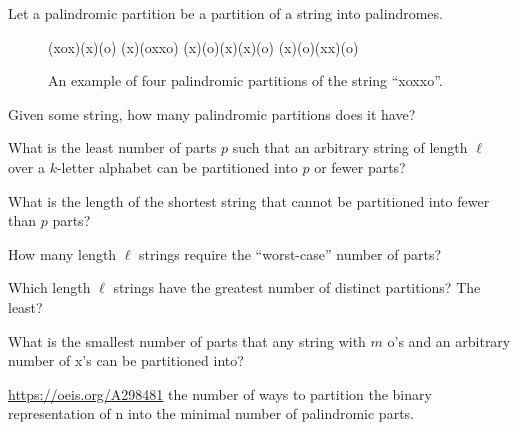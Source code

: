 \documentclass{article}
\begin{document}
  Let a palindromic partition be a partition of a string into palindromes.
  \begin{figure}[!h]
    \centering
    (xox)(x)(o) \hspace{0.5cm} (x)(oxxo) \hspace{0.5cm} (x)(o)(x)(x)(o) \hspace{0.5cm} (x)(o)(xx)(o)
    \caption{
      An example of four palindromic partitions of the string ``xoxxo''.
    }
  \end{figure}
\begin{question}
  Given some string, how many palindromic partitions does it have?
\end{question}
\begin{related}
  \item What is the least number of parts $p$ such that an arbitrary string of
    length $\ell$ over a $k$-letter alphabet can be partitioned into $p$ or
    fewer parts?
  \item What is the length of the shortest string that cannot be partitioned
    into fewer than $p$ parts?
  \item How many length $\ell$ strings require the ``worst-case'' number of
    parts?
  \item Which length $\ell$ strings have the greatest number of distinct
    partitions? The least?
  \item What is the smallest number of parts that any string with $m$ o's
    and an arbitrary number of x's can be partitioned into?
\end{related}
\begin{references}
  \item \url{https://oeis.org/A298481} the number of ways to partition the
    binary representation of n into the minimal number of palindromic parts.
\end{references}
\end{document}
